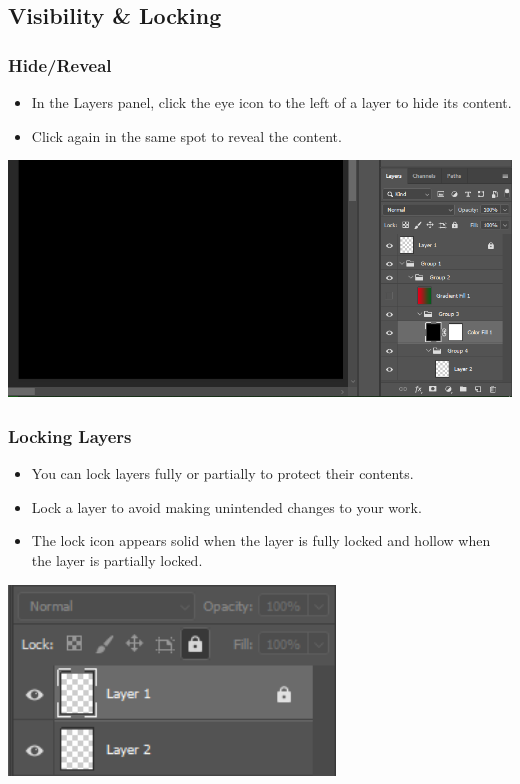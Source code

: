 \documentclass{beamer}
\begin{document}
		\subsection{Visibility \& Locking}		
\begin{frame}
	\frametitle{Hide/Reveal}
	\begin{itemize}
		\item In the Layers panel, click the eye icon to the left of a layer to hide its content. 
		\item Click again in the same spot to reveal the content.
	\end{itemize}
	\begin{center}
		\includegraphics[width = 1.0\textwidth]{images/visibility.png}
	\end{center}
\end{frame}

\begin{frame}
	\frametitle{Locking Layers}
	\begin{itemize}
		\item You can lock layers fully or partially to protect their contents.
		\item Lock a layer to avoid making unintended changes to your work.
		\item The lock icon appears solid when the layer is fully locked and hollow when the layer is partially locked.
	\end{itemize}
	\begin{center}
		\includegraphics[width = 0.65\textwidth]{images/lock.png}
	\end{center}
\end{frame}
	
\end{document}
